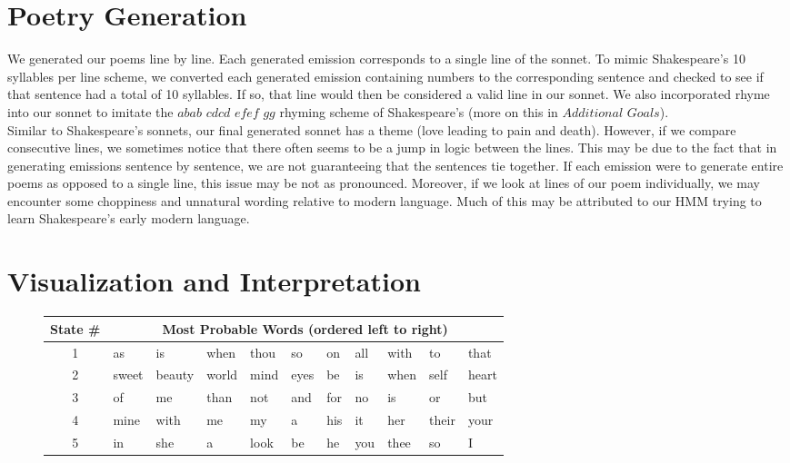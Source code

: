 \documentclass[11pt]{article}
\begin{document}
\section*{Poetry Generation}
We generated our poems line by line. Each generated emission corresponds to a single line of the sonnet. To mimic Shakespeare's 10 syllables per line scheme, we converted each generated emission containing numbers to the corresponding sentence and checked to see if that sentence had a total of 10 syllables. If so, that line would then be considered a valid line in our sonnet. We also incorporated rhyme into our sonnet to imitate the $\textit{abab cdcd efef gg}$
rhyming scheme of Shakespeare's (more on this in $\textit{Additional Goals}$). \\

\noindent Similar to Shakespeare's sonnets, our final generated sonnet has a theme (love leading to pain and death). However, if we compare consecutive lines, we sometimes notice that there often seems to be a jump in logic between the lines. This may be due to the fact that in generating emissions sentence by sentence, we are not guaranteeing that the sentences tie together. If each emission were to generate entire poems as opposed to a single line, this issue may be not as pronounced. Moreover, if we look at lines of our poem individually, we may encounter some choppiness and unnatural wording relative to modern language. Much of this may be attributed to our HMM trying to learn Shakespeare's early modern language. 


\section*{Visualization and Interpretation}
\begin{figure}[H]
\centering
\begin{tabular}{c*{10}{l}}
\toprule
State \# & \multicolumn{10}{c}{Most Probable Words (ordered left to right)} \\
\midrule
1 & as & is & when & thou & so & on & all & with & to & that \\
2 & sweet & beauty & world & mind & eyes & be & is & when & self & heart \\
3 & of & me & than & not & and & for & no & is & or & but \\
4 & mine & with & me & my & a & his & it & her & their & your \\
5 & in & she & a & look & be & he & you & thee & so & I \\

\bottomrule
\end{tabular}
\end{figure}
\end{document}
